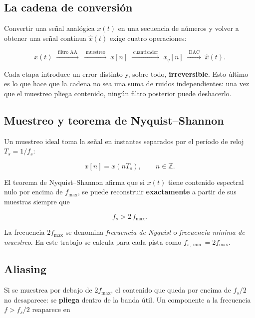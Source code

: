 \documentclass[11pt,a4paper]{article}
\newcommand{\fs}{f_s}
\newcommand{\fsmin}{f_{s,\min}}
\newcommand{\fmax}{f_{\max}}
\begin{document}
\subsection{La cadena de conversión}

Convertir una señal analógica \(x(t)\) en una secuencia de números y volver a
obtener una señal continua \(\hat{x}(t)\) exige cuatro operaciones:

\begin{equation}
x(t)\;\xrightarrow{\;\text{filtro AA}\;}\;
\xrightarrow{\;\text{muestreo}\;}\;
x[n]\;\xrightarrow{\;\text{cuantizador}\;}\;
x_q[n]\;\xrightarrow{\;\text{DAC}\;}\;\hat{x}(t).
\label{eq:cadena}
\end{equation}

Cada etapa introduce un error distinto y, sobre todo, \textbf{irreversible}.
Esto último es lo que hace que la cadena no sea una suma de ruidos
independientes: una vez que el muestreo pliega contenido, ningún filtro
posterior puede deshacerlo.

\subsection{Muestreo y teorema de Nyquist--Shannon}

Un muestreo ideal toma la señal en instantes separados por el período de
reloj \(T_s = 1/\fs\):

\begin{equation}
x[n] = x(nT_s), \qquad n \in \mathbb{Z}.
\end{equation}

El teorema de Nyquist--Shannon afirma que si \(x(t)\) tiene contenido espectral
nulo por encima de \(\fmax\), se puede reconstruir \textbf{exactamente} a
partir de sus muestras siempre que

\begin{equation}
\fs > 2\,\fmax .
\label{eq:nyquist}
\end{equation}

La frecuencia \(2\fmax\) se denomina \emph{frecuencia de Nyquist} o
\emph{frecuencia mínima de muestreo}. En este trabajo se calcula para cada
pista como \(\fsmin = 2\fmax\).

\subsection{Aliasing}

Si se muestrea por debajo de \(2\fmax\), el contenido que queda por encima de
\(\fs/2\) no desaparece: se \textbf{pliega} dentro de la banda útil. Un
componente a la frecuencia \(f > \fs/2\) reaparece en
\end{document}
